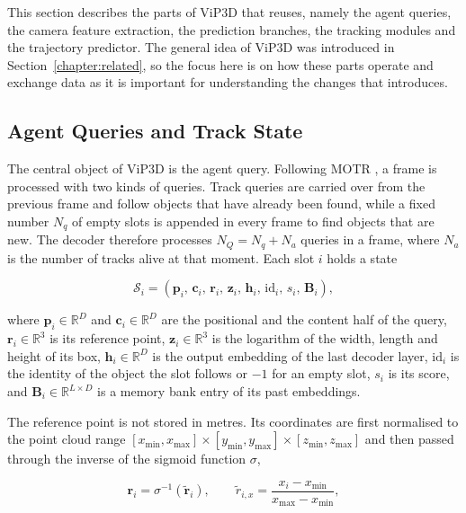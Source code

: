 This section describes the parts of ViP3D that \modelname reuses, namely the agent queries, the camera
feature extraction, the prediction branches, the tracking modules and the trajectory predictor. The general
idea of ViP3D was introduced in Section~\ref{chapter:related}, so the focus here is on how these parts
operate and exchange data as it is important for understanding the changes that \modelname introduces.

\subsection{Agent Queries and Track State}
\label{subsec:design-state}

The central object of ViP3D is the agent query. Following MOTR \cite{Zeng2022MOTR}, a frame is processed
with two kinds of queries. Track queries are carried over from the previous frame and follow objects that
have already been found, while a fixed number $N_q$ of empty slots is appended in every frame to find
objects that are new. The decoder therefore processes $N_Q = N_q + N_a$ queries in a frame, where $N_a$ is the
number of tracks alive at that moment. Each slot $i$ holds a state

\begin{equation}
    \mathcal{S}_i = \left( \mathbf{p}_i,\, \mathbf{c}_i,\, \mathbf{r}_i,\, \mathbf{z}_i,\, \mathbf{h}_i,\,
    \mathrm{id}_i,\, s_i,\, \mathbf{B}_i \right),
    \label{eq:design-state}
\end{equation}

where $\mathbf{p}_i \in \mathbb{R}^D$ and $\mathbf{c}_i \in \mathbb{R}^D$ are the positional and the content
half of the query, $\mathbf{r}_i \in \mathbb{R}^3$ is its reference point, $\mathbf{z}_i \in \mathbb{R}^3$ is
the logarithm of the width, length and height of its box, $\mathbf{h}_i \in \mathbb{R}^D$ is the output
embedding of the last decoder layer, $\mathrm{id}_i$ is the identity of the object the slot follows or $-1$
for an empty slot, $s_i$ is its score, and $\mathbf{B}_i \in \mathbb{R}^{L \times D}$ is a memory bank entry of its
past embeddings.

The reference point is not stored in metres. Its coordinates are first normalised to the point cloud range
$[x_{\min}, x_{\max}] \times [y_{\min}, y_{\max}] \times [z_{\min}, z_{\max}]$ and then passed through the
inverse of the sigmoid function $\sigma$,

\begin{equation}
    \mathbf{r}_i = \sigma^{-1}\!\left( \tilde{\mathbf{r}}_i \right), \qquad
    \tilde{r}_{i,x} = \frac{x_i - x_{\min}}{x_{\max} - x_{\min}},
    \label{eq:design-invsig}
\end{equation}

